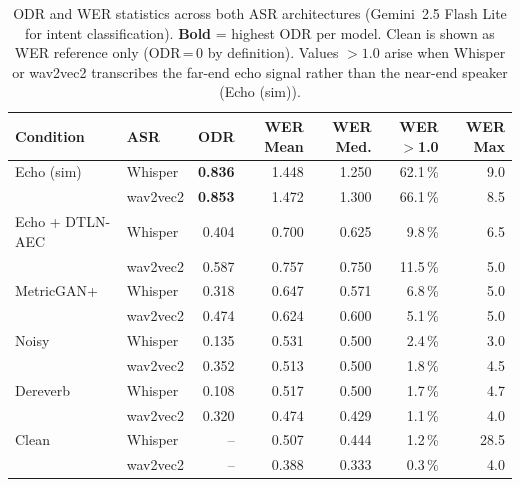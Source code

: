 \begin{table}[t]
  \centering
  \begin{tabular}{llrrrrr}
    \hline
    \textbf{Condition} & \textbf{ASR} & \textbf{ODR} &
    \textbf{WER Mean} & \textbf{WER Med.} &
    \textbf{WER${>}$1.0} & \textbf{WER Max} \\
    \hline
    Echo (sim) & Whisper & \textbf{0.836} & 1.448 & 1.250 & 62.1\,\% & 9.0 \\
     & wav2vec2 & \textbf{0.853} & 1.472 & 1.300 & 66.1\,\% & 8.5 \\
    Echo + DTLN-AEC & Whisper & 0.404 & 0.700 & 0.625 & 9.8\,\% & 6.5 \\
     & wav2vec2 & 0.587 & 0.757 & 0.750 & 11.5\,\% & 5.0 \\
    MetricGAN+ & Whisper & 0.318 & 0.647 & 0.571 & 6.8\,\% & 5.0 \\
     & wav2vec2 & 0.474 & 0.624 & 0.600 & 5.1\,\% & 5.0 \\
    Noisy & Whisper & 0.135 & 0.531 & 0.500 & 2.4\,\% & 3.0 \\
     & wav2vec2 & 0.352 & 0.513 & 0.500 & 1.8\,\% & 4.5 \\
    Dereverb & Whisper & 0.108 & 0.517 & 0.500 & 1.7\,\% & 4.7 \\
     & wav2vec2 & 0.320 & 0.474 & 0.429 & 1.1\,\% & 4.0 \\
    \hline
    Clean & Whisper & -- & 0.507 & 0.444 & 1.2\,\% & 28.5 \\
     & wav2vec2 & -- & 0.388 & 0.333 & 0.3\,\% & 4.0 \\
    \hline
  \end{tabular}
  \caption{ODR and WER statistics across both ASR
    architectures (Gemini~2.5 Flash Lite for intent
    classification). \textbf{Bold} = highest ODR per model.
    Clean is shown as WER reference only (ODR\,=\,0 by
    definition). Values ${>}1.0$ arise when Whisper or
    wav2vec2 transcribes the far-end echo signal rather
    than the near-end speaker (Echo (sim)).}
  \label{tab:model_comparison}
\end{table}
